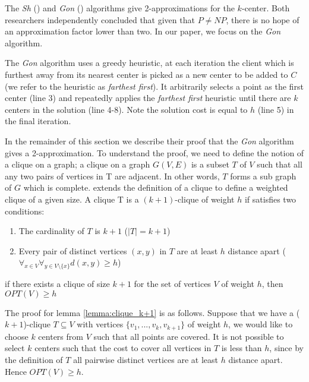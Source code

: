 The \emph{Sh} (\cite{hochbaum_best_1985}) and \emph{Gon} (\cite{gonzalez_clustering_1985}) algorithms give 2-approximations for the $k$-center. Both researchers independently concluded that given that $P\neq NP$, there is no hope of an approximation factor lower than two. In our paper, we focus on the \emph{Gon} algorithm.

The \emph{Gon} algorithm uses a greedy \gls{heuristic}, at each iteration the client which is furthest away from its nearest center is picked as a new center to be added to $C$ (we refer to the \gls{heuristic} as \emph{farthest first}). It arbitrarily selects a point as the first center (line 3) and repeatedly applies the \emph{farthest first} \gls{heuristic} until there are $k$ centers in the solution (line 4-8). Note the solution cost is equal to $h$ (line 5) in the final iteration.



In the remainder of this section we describe their proof that the \emph{Gon} algorithm gives a 2-approximation. To understand the proof, we need to define the notion of a clique on a graph; a clique on a graph $G(V, E)$ is a subset $T$ of $V$ such that all any two pairs of vertices in T are adjacent. In other words, $T$ forms a sub graph of $G$ which is complete. \textcite{gonzalez_clustering_1985} extends the definition of a clique to define a weighted clique of a given size. A clique T is a $(k+1)$-clique of weight $h$ if satisfies two conditions:
\begin{enumerate}
    \item The cardinality of $T$ is $k+1$ ($|T|=k+1$)
    \item Every pair of distinct vertices $(x,y)$ in $T$ are at least $h$ distance apart ($\forall _{x\in V}\forall _{y\in V\setminus \{x\}}d(x,y)\geq h$)
\end{enumerate}

\begin{lemma}\label{lemma:clique_k+1}
if there exists a clique of size $k+1$ for the set of vertices $V$ of weight $h$, then $OPT(V)\geq h$
\end{lemma} 

The proof for lemma \ref{lemma:clique_k+1} is as follows. Suppose that we have a ($k+1$)-clique $T\subseteq V$ with vertices $\{v_1, ...,v_k,v_{k+1}\}$ of weight $h$, we would like to choose $k$ centers from $V$ such that all points are covered. It is not possible to select $k$ centers such that the cost to cover all vertices in $T$ is less than $h$, since by the definition of $T$ all pairwise distinct vertices are at least $h$ distance apart. Hence $OPT(V)\geq h$.

